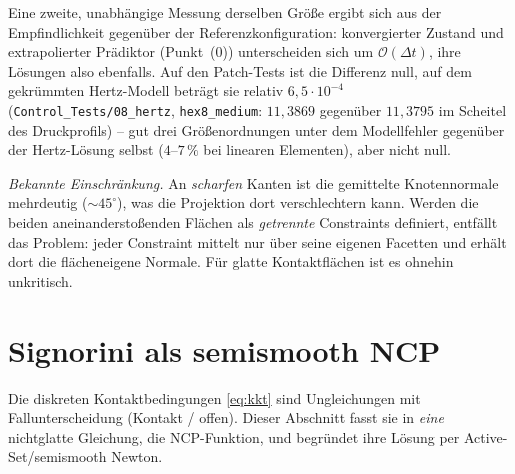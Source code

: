 \documentclass[a4paper,11pt]{article}
\newcommand{\code}[1]{\texttt{\small #1}}
\newcommand{\file}[1]{\texttt{\small #1}}
\let\stdsection\section
\renewcommand{\section}{\clearpage\stdsection}
\begin{document}
\medskip
\noindent Eine zweite, unabhängige Messung derselben Größe ergibt sich aus der Empfindlichkeit
gegenüber der Referenzkonfiguration: konvergierter Zustand und extrapolierter Prädiktor
(Punkt~(0)) unterscheiden sich um $\mathcal O(\Delta t)$, ihre Lösungen also ebenfalls. Auf den
Patch-Tests ist die Differenz null, auf dem gekrümmten Hertz-Modell beträgt sie relativ
$6{,}5\cdot10^{-4}$ (\file{Control\_Tests/08\_hertz}, \code{hex8\_medium}: $11{,}3869$ gegenüber
$11{,}3795$ im Scheitel des Druckprofils) -- gut drei Größenordnungen unter dem Modellfehler
gegenüber der Hertz-Lösung selbst ($4$--$7\,\%$ bei linearen Elementen), aber nicht null.

\medskip
\noindent\textit{Bekannte Einschränkung.} An \emph{scharfen} Kanten ist die gemittelte
Knotennormale mehrdeutig ($\sim45^\circ$), was die Projektion dort verschlechtern kann. Werden die
beiden aneinanderstoßenden Flächen als \emph{getrennte} Constraints definiert, entfällt das
Problem: jeder Constraint mittelt nur über seine eigenen Facetten und erhält dort die
flächeneigene Normale. Für glatte Kontaktflächen ist es ohnehin unkritisch.

\section{Signorini als semismooth NCP}
\label{sec:ncp}

Die diskreten Kontaktbedingungen \eqref{eq:kkt} sind Ungleichungen mit Fallunterscheidung
(Kontakt / offen). Dieser Abschnitt fasst sie in \emph{eine} nichtglatte Gleichung, die
NCP-Funktion, und begründet ihre Lösung per Active-Set/semismooth Newton.
\end{document}

